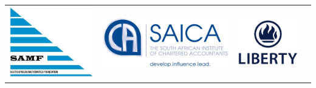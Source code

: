 \documentclass{article}
\begin{document}
\setlength{\tabcolsep}{0.01475\textwidth}
\begin{center} \begin{tabular}{cccc}
	\includegraphics[height=0.105\textheight]{SAMF_logo.jpg} &
	\includegraphics[height=0.105\textheight]{SAICA_logo.jpg} &
	\includegraphics[height=0.105\textheight]{Liberty_logo.jpg} &

\end{tabular}
\end{center}
\end{document}
